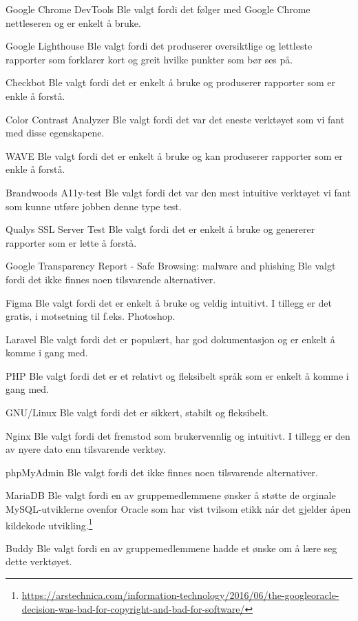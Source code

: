 \begin{compactdesc}
\item[Google Chrome DevTools] Ble valgt fordi det følger med Google Chrome nettleseren og er enkelt å bruke.
\item[Google Lighthouse] Ble valgt fordi det produserer oversiktlige og lettleste rapporter som forklarer kort og greit hvilke punkter som bør ses på.
\item[Checkbot] Ble valgt fordi det er enkelt å bruke og produserer rapporter som er enkle å forstå.
\item[Color Contrast Analyzer] Ble valgt fordi det var det eneste verktøyet som vi fant med disse egenskapene.
\item[WAVE] Ble valgt fordi det er enkelt å bruke og kan produserer rapporter som er enkle å forstå.
\item[Brandwoods A11y-test] Ble valgt fordi det var den mest intuitive verktøyet vi fant som kunne utføre jobben denne type test.
\item[Qualys SSL Server Test] Ble valgt fordi det er enkelt å bruke og genererer rapporter som er lette å forstå.
\item[Google Transparency Report - Safe Browsing: malware and phishing] Ble valgt fordi det ikke finnes noen tilsvarende alternativer.
\item[Figma] Ble valgt fordi det er enkelt å bruke og veldig intuitivt. I tillegg er det gratis, i motsetning til f.eks. Photoshop.
\item[Laravel] Ble valgt fordi det er populært, har god dokumentasjon og er enkelt å komme i gang med.
\item[PHP] Ble valgt fordi det er et relativt  og fleksibelt språk som er enkelt å komme i gang med.
\item [GNU/Linux] Ble valgt fordi det er sikkert, stabilt og fleksibelt.
\item[Nginx] Ble valgt fordi det fremstod som brukervennlig og intuitivt. I tillegg er den av nyere dato enn tilsvarende verktøy.
\item[phpMyAdmin] Ble valgt fordi det ikke finnes noen tilsvarende alternativer.
\item[MariaDB] Ble valgt fordi en av gruppemedlemmene ønsker å støtte de orginale MySQL-utviklerne ovenfor Oracle som har vist tvilsom etikk når det gjelder åpen kildekode utvikling.\footnote{\url{https://arstechnica.com/information-technology/2016/06/the-googleoracle-decision-was-bad-for-copyright-and-bad-for-software/}}
\item[Buddy] Ble valgt fordi en av gruppemedlemmene hadde et ønske om å lære seg dette verktøyet.

\end{compactdesc}

